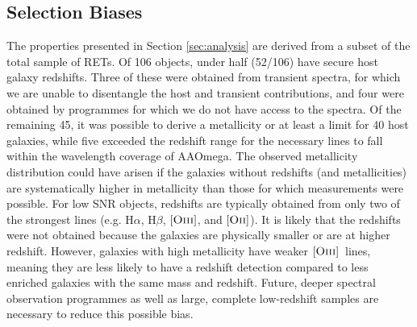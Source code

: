 \documentclass[fleqn,usenatbib,]{mnras}
\newcommand{\halpha}[0]{H$\alpha$}
\newcommand{\hbeta}[0]{H$\beta$}
\newcommand{\OII}[0]{$[\textnormal{\textsc{Oii}}]$}
\newcommand{\OIII}[0]{$[\textnormal{\textsc{Oiii}}]$}
\begin{document}
\subsection{Selection Biases \label{subsec:disc_bias}}
The properties presented in Section \ref{sec:analysis} are derived from a subset of the total sample of RETs. Of 106 objects, under half (52/106) have secure host galaxy redshifts. Three of these were obtained from transient spectra, for which we are unable to disentangle the host and transient contributions, and four were obtained by programmes for which we do not have access to the spectra. Of the remaining 45, it was possible to derive a metallicity or at least a limit for 40 host galaxies, while five exceeded the redshift range for the necessary lines to fall within the wavelength coverage of AAOmega. The observed metallicity distribution could have arisen if the galaxies without redshifts (and metallicities) are systematically higher in metallicity than those for which measurements were possible. For low SNR objects, redshifts are typically obtained from only two of the strongest lines (e.g. \halpha, \hbeta, \OIII, and \OII). It is likely that the redshifts were not obtained because the galaxies are physically smaller or are at higher redshift. However, galaxies with high metallicity have weaker \OIII~lines, meaning they are less likely to have a redshift detection compared to less enriched galaxies with the same mass and redshift. Future, deeper spectral observation programmes as well as large, complete low-redshift samples are necessary to reduce this possible bias.
\end{document}

